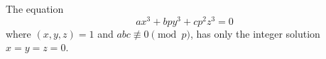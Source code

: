 \begin{proposition}
    The equation
\[
    ax^3+bpy^3+cp^2z^3=0
\]
    where $(x,y,z)=1$ and $abc\not\equiv0\pmod p$, has only the integer solution $x=y=z=0$.
\end{proposition}
